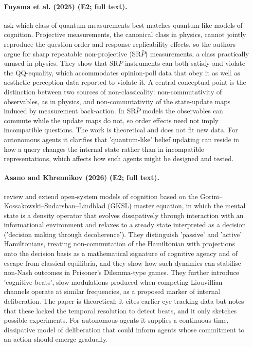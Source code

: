 \documentclass[10pt,a4paper]{article}
\begin{document}
\paragraph{Fuyama et al. (2025) (E2; full text).} \citet{Fuyama2025} ask which class of quantum measurements best matches quantum-like models of cognition. Projective measurements, the canonical class in physics, cannot jointly reproduce the question order and response replicability effects, so the authors argue for sharp repeatable non-projective (SR$\bar{P}$) measurements, a class practically unused in physics. They show that SR$\bar{P}$ instruments can both satisfy and violate the QQ-equality, which accommodates opinion-poll data that obey it as well as aesthetic-perception data reported to violate it. A central conceptual point is the distinction between two sources of non-classicality: non-commutativity of observables, as in physics, and non-commutativity of the state-update maps induced by measurement back-action. In SR$\bar{P}$ models the observables can commute while the update maps do not, so order effects need not imply incompatible questions. The work is theoretical and does not fit new data. For autonomous agents it clarifies that 'quantum-like' belief updating can reside in how a query changes the internal state rather than in incompatible representations, which affects how such agents might be designed and tested.

\paragraph{Asano and Khrennikov (2026) (E2; full text).} \citet{Asano2026} review and extend open-system models of cognition based on the Gorini--Kossakowski--Sudarshan--Lindblad (GKSL) master equation, in which the mental state is a density operator that evolves dissipatively through interaction with an informational environment and relaxes to a steady state interpreted as a decision ('decision making through decoherence'). They distinguish 'passive' and 'active' Hamiltonians, treating non-commutation of the Hamiltonian with projections onto the decision basis as a mathematical signature of cognitive agency and of escape from classical equilibria, and they show how such dynamics can stabilise non-Nash outcomes in Prisoner's Dilemma-type games. They further introduce 'cognitive beats', slow modulations produced when competing Liouvillian channels operate at similar frequencies, as a proposed marker of internal deliberation. The paper is theoretical: it cites earlier eye-tracking data but notes that these lacked the temporal resolution to detect beats, and it only sketches possible experiments. For autonomous agents it supplies a continuous-time, dissipative model of deliberation that could inform agents whose commitment to an action should emerge gradually.
\end{document}
